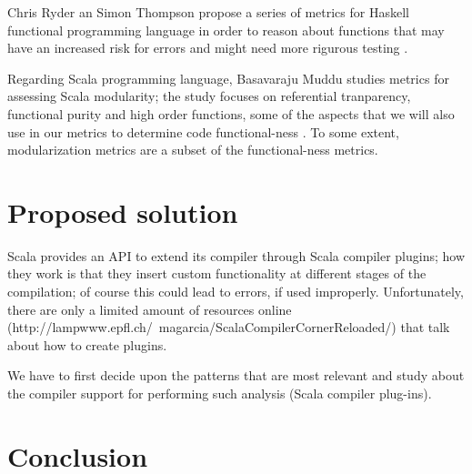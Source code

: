 \documentclass{article}
\begin{document}
Chris Ryder an Simon Thompson propose a series of metrics for Haskell functional programming language in order to reason about functions that may have an increased risk for errors and might need more rigurous testing \cite{RyderT05:TFP_2005_Intellect}. \par

Regarding Scala programming language, Basavaraju Muddu studies metrics for assessing Scala modularity; the study focuses on referential tranparency, functional purity and high order functions, some of the aspects that we will also use in our metrics to determine code functional-ness \cite{DBLP:conf/icse/MudduABP13}. To some extent, modularization metrics are a subset of the functional-ness metrics. \par

\section{Proposed solution}

Scala provides an API to extend its compiler through Scala compiler plugins; how they work is that they insert custom functionality at different stages of the compilation; of course this could lead to errors, if used improperly. Unfortunately, there are only a limited amount of resources online (http://lampwww.epfl.ch/~magarcia/ScalaCompilerCornerReloaded/) that talk about how to create plugins. \par
We have to first decide upon the patterns that are most relevant and study about the compiler support for performing such analysis (Scala compiler plug-ins). 

\section{Conclusion}


\newpage


 

\end{document}
